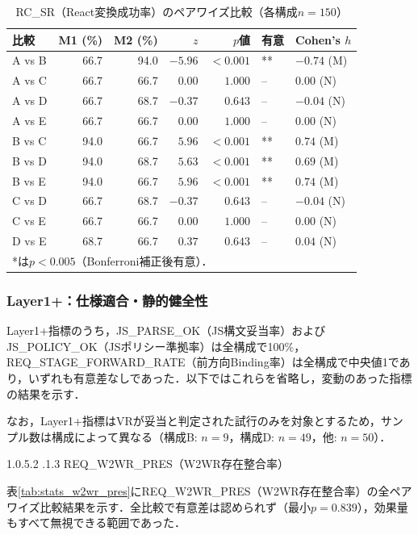 \documentclass[a4paper,10pt]{jarticle}
\makeatletter
\newcommand{\subsubsubsection}{\@startsection{paragraph}{4}{\z@}%
{1.0\Cvs \@plus.5\Cdp \@minus.2\Cdp}%
{.1\Cvs \@plus.3\Cdp}%
{\reset@font\sffamily\normalsize}
}
\makeatother
\begin{document}
\begin{table}[htbp]
\centering
\caption{RC\_SR（React変換成功率）のペアワイズ比較（各構成$n=150$）}
\label{tab:stats_rcsr}
\small
\begin{tabular}{lrrrrll}
\toprule
比較 & M1 (\%) & M2 (\%) & $z$ & $p$値 & 有意 & Cohen's $h$ \\
\midrule
A vs B & 66.7 & 94.0 & $-5.96$ & $<0.001$ & ** & $-0.74$ (M) \\
A vs C & 66.7 & 66.7 & $0.00$ & $1.000$ & -- & $0.00$ (N) \\
A vs D & 66.7 & 68.7 & $-0.37$ & $0.643$ & -- & $-0.04$ (N) \\
A vs E & 66.7 & 66.7 & $0.00$ & $1.000$ & -- & $0.00$ (N) \\
B vs C & 94.0 & 66.7 & $5.96$ & $<0.001$ & ** & $0.74$ (M) \\
B vs D & 94.0 & 68.7 & $5.63$ & $<0.001$ & ** & $0.69$ (M) \\
B vs E & 94.0 & 66.7 & $5.96$ & $<0.001$ & ** & $0.74$ (M) \\
C vs D & 66.7 & 68.7 & $-0.37$ & $0.643$ & -- & $-0.04$ (N) \\
C vs E & 66.7 & 66.7 & $0.00$ & $1.000$ & -- & $0.00$ (N) \\
D vs E & 68.7 & 66.7 & $0.37$ & $0.643$ & -- & $0.04$ (N) \\
\bottomrule
\multicolumn{7}{l}{\small **は$p < 0.005$（Bonferroni補正後有意）．} \\
\end{tabular}
\end{table}


\subsubsection{Layer1+：仕様適合・静的健全性}

Layer1+指標のうち，JS\_PARSE\_OK（JS構文妥当率）およびJS\_POLICY\_OK（JSポリシー準拠率）は全構成で100\%，REQ\_STAGE\_FORWARD\_RATE（前方向Binding率）は全構成で中央値1であり，いずれも有意差なしであった．以下ではこれらを省略し，変動のあった指標の結果を示す．

なお，Layer1+指標はVRが妥当と判定された試行のみを対象とするため，サンプル数は構成によって異なる（構成B: $n=9$，構成D: $n=49$，他: $n=50$）．

\subsubsubsection{REQ\_W2WR\_PRES（W2WR存在整合率）}

表\ref{tab:stats_w2wr_pres}にREQ\_W2WR\_PRES（W2WR存在整合率）の全ペアワイズ比較結果を示す．全比較で有意差は認められず（最小$p = 0.839$），効果量もすべて無視できる範囲であった．
\end{document}
